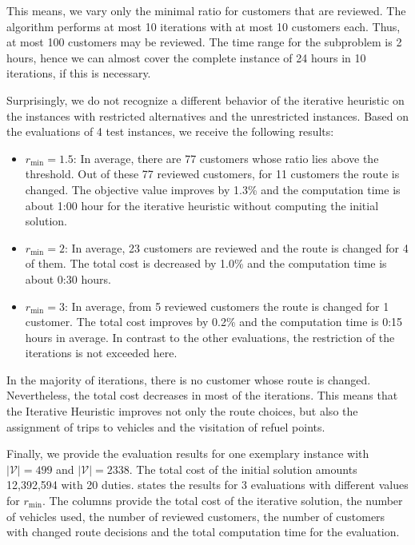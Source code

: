 This means, we vary only the minimal ratio for customers that are reviewed. The algorithm performs at most 10 iterations with at most 10 customers each. Thus, at most 100 customers may be reviewed. The time range for the subproblem is 2 hours, hence we can almost cover the complete instance of 24 hours in 10 iterations, if this is necessary.

Surprisingly, we do not recognize a different behavior of the iterative heuristic on the instances with restricted alternatives and the unrestricted instances. Based on the evaluations of 4 test instances, we receive the following results:
\begin{itemize}
	\item{$r_{\min} = 1.5$:}
In average, there are 77 customers whose ratio lies above the threshold. Out of these 77 reviewed customers, for 11 customers the route is changed. The objective value improves by 1.3\% and the computation time is about 1:00 hour for the iterative heuristic without computing the initial solution.
	\item{$r_{\min} = 2$:}
In average, 23 customers are reviewed and the route is changed for 4 of them. The total cost is decreased by 1.0\% and the computation time is about 0:30 hours.
	\item{$r_{\min} = 3$:}
In average, from 5 reviewed customers the route is changed for 1 customer. The total cost improves by 0.2\% and the computation time is 0:15 hours in average. In contrast to the other evaluations, the restriction of the iterations is not exceeded here.
\end{itemize}

In the majority of iterations, there is no customer whose route is changed. Nevertheless, the total cost decreases in most of the iterations. This means that the Iterative Heuristic improves not only the route choices, but also the assignment of trips to vehicles and the visitation of refuel points.

Finally, we provide the evaluation results for one exemplary instance with ${\vert\mathcal{V}\vert=499}$ and ${\vert\mathcal{V}\vert=2338}$. The total cost of the initial solution amounts 12,392,594 with 20 duties.  states the results for 3 evaluations with different values for $r_{\min}$. The columns provide the total cost of the iterative solution, the number of vehicles used, the number of reviewed customers, the number of customers with changed route decisions and the total computation time for the evaluation.

